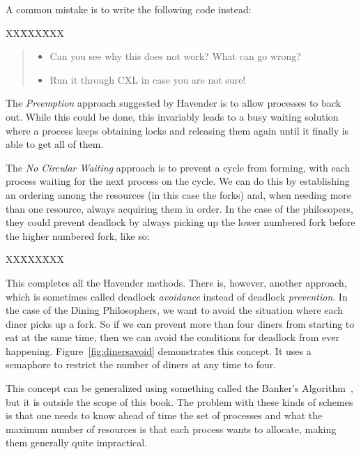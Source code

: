 \documentclass{report}
\newcommand{\cxlsource}[1]{
\begin{tabbing}
XX\=XXX\=XXX\kill
    
\end{tabbing}
}
\newenvironment{code}{
\tcolorbox
}{
\endtcolorbox
}
\begin{document}
A common mistake is to write the following code instead:

\begin{code}
\cxlsource{baddblwait}
\end{code}

\begin{quote}
\begin{itemize}
\item Can you see why this does not work?  What can go wrong?
\item Run it through CXL in case you are not sure!
\end{itemize}
\end{quote}

The \emph{Preemption} approach suggested by Havender is to allow processes to back out.
While this could be done, this invariably leads to a busy waiting solution
where a process keeps obtaining locks and releasing them again until it
finally is able to get all of them.

The \emph{No Circular Waiting} approach
is to prevent a cycle from forming, with each
process waiting for the next process on the cycle.
We can do this by establishing an ordering among the
resources (in this case the forks) and, when needing more than one
resource, always acquiring them in order.  In the case of the philosopers,
they could prevent deadlock by always picking up the lower numbered fork
before the higher numbered fork, like so:

\vspace{1em}
\begin{code}
\cxlsource{dinersfix}
\end{code}
\vspace{1em}

This completes all the Havender methods.
There is, however, another approach, which is sometimes called deadlock
\emph{avoidance}
instead of deadlock \emph{prevention}.
In the case of the Dining Philosophers, we want to avoid the situation where each
diner picks up a fork.  So if we can prevent more than four diners from starting to
eat at the same time, then we can avoid the conditions for deadlock from ever
happening.
Figure~\ref{fig:dinersavoid} demonstrates this concept.  It uses a semaphore to
restrict the number of diners at any time to four.

This concept can be generalized using something called the
Banker's Algorithm~\cite{EWD108}, but it is outside the scope of this book.
The problem with these kinds of schemes is that one needs to know ahead of time
the set of processes and what the maximum number of resources is that each process
wants to allocate, making them generally quite impractical.
\end{document}
